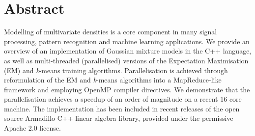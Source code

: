 \section*{Abstract}

Modelling of multivariate densities is a core component in many signal processing, pattern recognition and machine learning applications.
We provide an overview of an implementation of Gaussian mixture models in the C++ language,
as well as multi-threaded (parallelised) versions of the Expectation Maximisation (EM) and {\it k}-means training algorithms.
Parallelisation is achieved through reformulation of the EM and {\it k}-means algorithms into a MapReduce-like framework
and employing OpenMP compiler directives.
We demonstrate that the parallelisation achieves a speedup of an order of magnitude on a recent 16 core machine.
The implementation has been included in recent releases of the open source Armadillo C++ linear algebra library,
provided under the permissive Apache 2.0 license.

